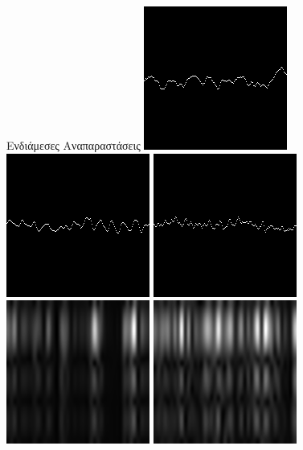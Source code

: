 \documentclass{beamer}
\begin{document}
\begin{frame}[c]{Ενδιάμεσες Αναπαραστάσεις}
	\includegraphics[scale=0.26]{signal_as_image_healthy_area.png}
	\includegraphics[scale=0.26]{signal_as_image_tumor_area.png}
	\includegraphics[scale=0.26]{signal_as_image_epilepsy.png}
	\\
	\includegraphics[scale=0.26]{spectrogram_eyes_open.png}
	\includegraphics[scale=0.26]{spectrogram_eyes_closed.png}

\end{frame}
\end{document}
